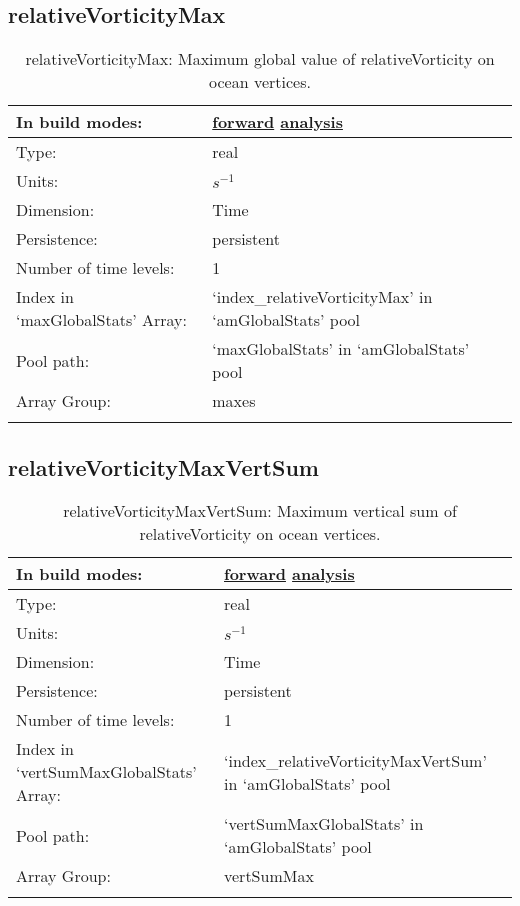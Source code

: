 \subsection[relativeVorticityMax]{relativeVorticityMax}
\label{subsec:var_sec_amGlobalStats_relativeVorticityMax}
\begin{center}
\begin{longtable}{| p{2.0in} | p{4.0in} |}
        \hline 
        In build modes: & \hyperref[subsec:forward_var_tab_amGlobalStats]{forward} \hyperref[subsec:analysis_var_tab_amGlobalStats]{analysis} \\
        \hline 
        Type: & real \\
        \hline 
        Units: & $s^{-1}$ \\
        \hline 
        Dimension: & Time \\
        \hline 
        Persistence: & persistent \\
        \hline 
        Number of time levels: & 1 \\
        \hline 
		 Index in `maxGlobalStats' Array: & `index\_relativeVorticityMax' in `amGlobalStats' pool \\
		 \hline 
            Pool path: & `maxGlobalStats' in `amGlobalStats' pool \\
		 \hline 
		 Array Group: & maxes \\
		 \hline 
    \caption{relativeVorticityMax: Maximum global value of relativeVorticity on ocean vertices.}
\end{longtable}
\end{center}
\subsection[relativeVorticityMaxVertSum]{relativeVorticityMaxVertSum}
\label{subsec:var_sec_amGlobalStats_relativeVorticityMaxVertSum}
\begin{center}
\begin{longtable}{| p{2.0in} | p{4.0in} |}
        \hline 
        In build modes: & \hyperref[subsec:forward_var_tab_amGlobalStats]{forward} \hyperref[subsec:analysis_var_tab_amGlobalStats]{analysis} \\
        \hline 
        Type: & real \\
        \hline 
        Units: & $s^{-1}$ \\
        \hline 
        Dimension: & Time \\
        \hline 
        Persistence: & persistent \\
        \hline 
        Number of time levels: & 1 \\
        \hline 
		 Index in `vertSumMaxGlobalStats' Array: & `index\_relativeVorticityMaxVertSum' in `amGlobalStats' pool \\
		 \hline 
            Pool path: & `vertSumMaxGlobalStats' in `amGlobalStats' pool \\
		 \hline 
		 Array Group: & vertSumMax \\
		 \hline 
    \caption{relativeVorticityMaxVertSum: Maximum vertical sum of relativeVorticity on ocean vertices.}
\end{longtable}
\end{center}
